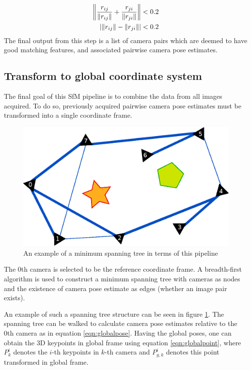 \documentclass[10pt,twocolumn,letterpaper]{article}
\newcommand{\norm}[1]{\left\lVert #1 \right\rVert}
\DeclarePairedDelimiter\abs{\lvert}{\rvert}
\begin{document}
\begin{align}
\norm{\frac{r_{ij}}{\norm{r_{ij}}} + \frac{r_{ji}}{\norm{r_{ji}}}} < 0.2
\label{eqn:check1}\\
\abs{\norm{r_{ij}} - \norm{r_{ji}}} < 0.2\label{eqn:check2}
\end{align}
The final output from this step is a list of camera pairs which are deemed to
have good matching features, and associated pairwise camera pose estimates.



\subsection{Transform to global coordinate system}

The final goal of this SfM pipeline is to combine the data from all images
acquired. To do so, previously acquired pairwise camera pose estimates must
be transformed into a single coordinate frame.

\begin{figure}[t]
\begin{center}
   \includegraphics[width=0.9\linewidth]{figures/spanning_tree.eps}
\end{center}
\caption{An example of a minimum spanning tree in terms of this pipeline}
\label{fig:spanning}
\end{figure}

The 0th camera is selected to be the reference coordinate frame. A breadth-first
algorithm is used to construct a minimum spanning tree with cameras as nodes and
the existence of camera pose estimate as edges (whether an image pair exists).

An example of such a spanning tree structure can be seen in figure
\ref{fig:spanning}. 
The spanning tree can be walked to calculate camera pose estimates relative to
the 0th camera as in equation \ref{eqn:globalpose}. Having the global poses, one can obtain the 3D keypoints in global frame using equation \ref{eqn:globalpoint}, where $P^{i}_{k}$ denotes the $i$-th keypoints in $k$-th camera and $P^{i}_{g,k}$ denotes this point transformed in global frame.
\end{document}
